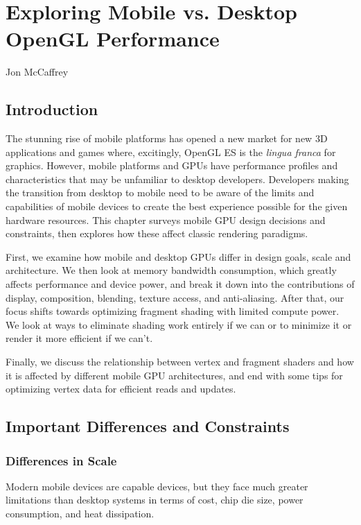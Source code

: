 \chapter{Exploring Mobile vs. Desktop OpenGL Performance}{Jon McCaffrey}
\label{Exploring-Mobile-vs-Desktop-OpenGL-Performance}

\section{Introduction}

The stunning rise of mobile platforms has opened a new market for new 3D
applications and games where, excitingly, OpenGL ES is the \textit{lingua
franca} for graphics. However, mobile platforms and GPUs have performance
profiles and characteristics that may be unfamiliar to desktop developers.
Developers making the transition from desktop to mobile need to be aware of
the limits and capabilities of mobile devices to create the best experience
possible for the given hardware resources.  This chapter surveys mobile GPU
design decisions and constraints, then explores how these affect classic
rendering paradigms.

First, we examine how mobile and desktop GPUs differ in design goals, scale and
architecture.  We then look at memory bandwidth consumption, which greatly
affects performance and device power, and break it down into the contributions
of display, composition, blending, texture access, and anti-aliasing.  After
that, our focus shifts towards optimizing fragment shading with limited compute
power.  We look at ways to eliminate shading work entirely if we can or to
minimize it or render it more efficient if we can't.  

Finally, we discuss the relationship between vertex and fragment shaders and
how it is affected by different mobile GPU architectures, and end with some
tips for optimizing vertex data for efficient reads and updates.

\section{Important Differences and Constraints}\label{Jon-McCaffrey:Constraints-Inspire-Creativity}

\subsection{Differences in Scale}
\label{Jon-McCaffrey:Architectural-Differences} Modern mobile devices are
capable devices, but they face much greater limitations than desktop systems in
terms of cost, chip die size, power consumption, and heat dissipation.

